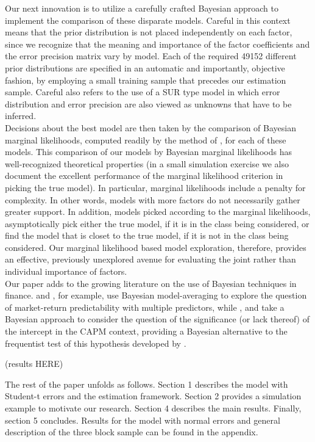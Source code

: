 \documentclass[12pt]{article}
\begin{document}
   Our next innovation is to utilize a carefully crafted Bayesian approach to implement the comparison of these disparate models. Careful in this context means that the prior distribution is not placed independently on each factor, since we recognize that the meaning and importance of the factor coefficients and the error precision matrix vary by model. Each of the required 49152 different prior distributions are specified in an automatic and importantly, objective fashion, by employing a small training sample that precedes our estimation sample. Careful also refers to the use of a SUR type model in which error distribution and error precision are also viewed as unknowns that have to be inferred. \\
   Decisions about the best model are then taken by the comparison of Bayesian marginal likelihoods, computed readily by the method of \cite{chib1995marginal}, for each of these models. This comparison of our models by Bayesian marginal likelihoods has well-recognized theoretical properties (in a small simulation exercise we also document the excellent performance of the marginal likelihood criterion in picking the true model). In particular, marginal likelihoods include a penalty for complexity. In other words, models with more factors do not necessarily gather greater support. In addition, models picked according to the marginal likelihoods, asymptotically pick either the true model, if it is in the class being considered, or find the model that is closet to the true model, if it is not in the class being considered. Our marginal likelihood based model exploration, therefore, provides an effective, previously unexplored avenue for evaluating the joint rather than individual importance of factors.  \\
  Our paper adds to the growing literature on the use of Bayesian techniques in finance. \cite{avramov2002stock} and \cite{cremers2002stock}, for example, use Bayesian model-averaging to explore the question of market-return predictability with multiple predictors, while \cite{shanken1987bayesian}, \cite{harvey1990bayesian} and \cite{avramov2006exact} take a Bayesian approach to consider the question of the significance (or lack thereof) of the intercept in the CAPM context, providing a Bayesian alternative to the frequentist test of this hypothesis developed by \cite{gibbons1989test}.

 (results HERE)

 The rest of the paper unfolds as follows. Section 1 describes the model with Student-t errors and the estimation framework. Section 2 provides a simulation example to motivate our research. Section 4 describes the main results. Finally, section 5 concludes. Results for the model with normal errors and general description of the three block sample can be found in the
 appendix.
\end{document}
